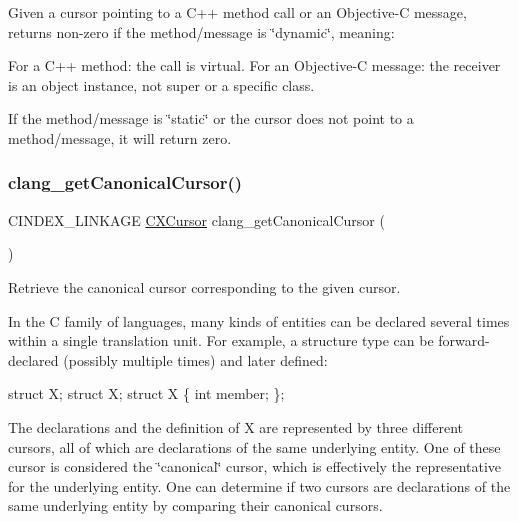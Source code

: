 Given a cursor pointing to a C++ method call or an Objective-\/C message, returns non-\/zero if the method/message is \char`\"{}dynamic\char`\"{}, meaning\+: 

For a C++ method\+: the call is virtual. For an Objective-\/C message\+: the receiver is an object instance, not \textquotesingle{}super\textquotesingle{} or a specific class.

If the method/message is \char`\"{}static\char`\"{} or the cursor does not point to a method/message, it will return zero. \mbox{\label{group__CINDEX__CURSOR__XREF_gac802826668be9fd40a017523cc7d24fe}} 
\subsubsection{\texorpdfstring{clang\+\_\+get\+Canonical\+Cursor()}{clang\_getCanonicalCursor()}}
{\footnotesize\ttfamily C\+I\+N\+D\+E\+X\+\_\+\+L\+I\+N\+K\+A\+GE \mbox{\hyperlink{structCXCursor}{C\+X\+Cursor}} clang\+\_\+get\+Canonical\+Cursor (\begin{DoxyParamCaption}\item[{\mbox{\hyperlink{structCXCursor}{C\+X\+Cursor}}}]{ }\end{DoxyParamCaption})}



Retrieve the canonical cursor corresponding to the given cursor. 

In the C family of languages, many kinds of entities can be declared several times within a single translation unit. For example, a structure type can be forward-\/declared (possibly multiple times) and later defined\+:


\begin{DoxyCode}
\textcolor{keyword}{struct }X;
\textcolor{keyword}{struct }X;
\textcolor{keyword}{struct }X \{
  \textcolor{keywordtype}{int} member;
\};
\end{DoxyCode}


The declarations and the definition of {\ttfamily X} are represented by three different cursors, all of which are declarations of the same underlying entity. One of these cursor is considered the \char`\"{}canonical\char`\"{} cursor, which is effectively the representative for the underlying entity. One can determine if two cursors are declarations of the same underlying entity by comparing their canonical cursors.

